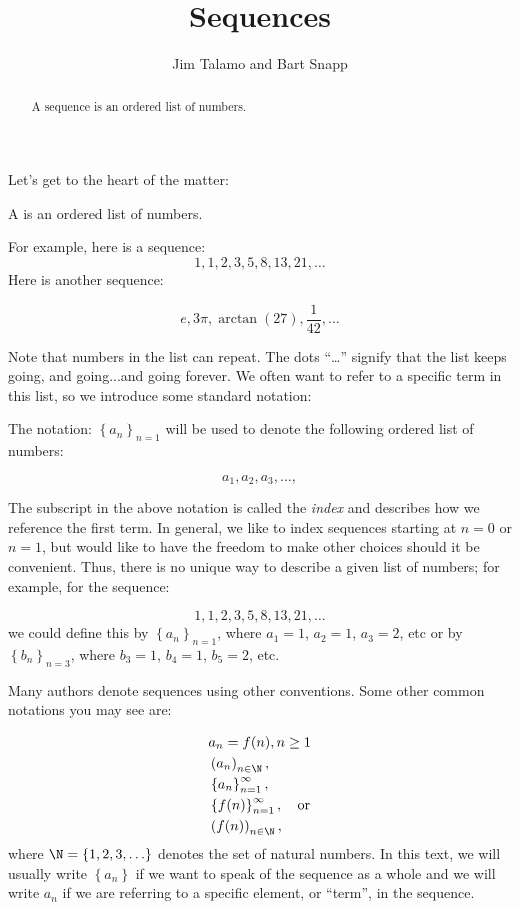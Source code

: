 \documentclass{ximera}
\author{Jim Talamo and Bart Snapp}
\title[Dig-In:]{Sequences}
\begin{document}
\begin{abstract}
  A sequence is an ordered list of numbers.
\end{abstract}
\maketitle

Let's get to the heart of the matter:

\begin{definition}
  A  is an ordered list of numbers.
\end{definition}

For example, here is a sequence:
\[
1,1, 2, 3, 5, 8, 13, 21, \ldots
\]
Here is another sequence:

\[
e, 3\pi, \arctan(27), \frac{1}{42}, \ldots
\]


Note that numbers in the list can repeat.  The dots ``\ldots'' signify that the list keeps
going, and going...and going forever.  We often want to refer to a specific term in this list, so we introduce some standard notation:
\begin{definition} The notation:  $\left\{a_n\right\}_{n=1}$ will be used to denote the following ordered list of numbers:

\[
a_1, a_2,  a_3, \ldots,
\]
\end{definition}

The subscript in the above notation is called the \emph{index} and describes how we reference the first term.  In general, we like to index sequences starting at $n=0$ or $n=1$, but would like to have the freedom to make other choices should it be convenient.  Thus, there is no unique way to describe a given list of numbers; for example, for the sequence:

\[
1,1, 2, 3, 5, 8, 13, 21, \ldots
\]
we could define this by $\left\{a_n\right\}_{n=1}$, where $a_1=1$, $a_2=1$, $a_3=2$, etc or by  $\left\{b_n\right\}_{n=3}$, where $b_3=1$, $b_4=1$, $b_5=2$, etc.

\begin{remark}
Many authors denote sequences using other conventions.  Some other common notations you may see are: 

\begin{align*}
  &a_n = f(n), n \geq 1   \\
  & \left(a_n\right)_{n \in \N}, \\
  & \left\{a_n\right\}_{n=1}^\infty, \\
  & \left\{f(n)\right\}_{n=1}^\infty, \quad \text{or} \\
  & \left(f(n)\right)_{n \in \N},
\end{align*}
where $\N = \{1,2,3, \ldots \}$ denotes the set of natural  numbers. In this text, we will usually write $\left\{a_n\right\}$ if we want to speak of the sequence as a whole and we will write $a_n$ if we are referring to a specific element, or ``term'', in the sequence.

\end{remark}
\end{document}
